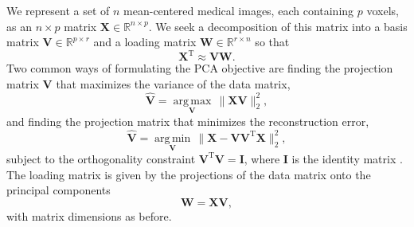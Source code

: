 \documentclass[11pt]{nih}
\begin{document}
We represent a set of $n$ mean-centered medical images, each containing $p$ voxels, as an $n \times p$ matrix $\mathbf{X} \in \mathbb{R}^{n \times p}$.  We seek a decomposition of this matrix into a basis matrix $\mathbf{V} \in \mathbb{R}^{p \times r}$ and a loading matrix $\mathbf{W} \in \mathbb{R}^{r \times n}$  so that 
\begin{equation}
\mathbf{X}^{\mathrm{T}} \approx \mathbf{VW}.
\end{equation}
Two  common ways of formulating the PCA objective are finding the projection matrix $\mathbf{V}$ that maximizes the variance of the data matrix,
\begin{equation}
\hat{\mathbf{V}} =  \underset{\mathbf{V}}{\operatorname{arg\,max}} \, \| \mathbf{XV} \|_2^2,
\end{equation}
and finding the projection matrix that minimizes the reconstruction error, 
\begin{equation}
\mathbf{\hat{V}} = \underset{\mathbf{V}} {\operatorname{arg \,  min}} \, \| \mathbf{X} - \mathbf{VV}^{\mathrm{T}}  \mathbf{X}\|_2^2,
\label{eqn:reconstruction_error}
\end{equation}
subject to the orthogonality constraint $\mathbf{V}^{\mathrm{T}}\mathbf{V}=\mathbf{I}$, where $\mathbf{I}$ is the identity matrix \cite{hastie_elements_2009}.
The loading matrix is given by the projections of the data matrix onto the principal components
\begin{equation}
\mathbf{W} = \mathbf{XV},
\end{equation}
with matrix dimensions as before. 
\end{document}
